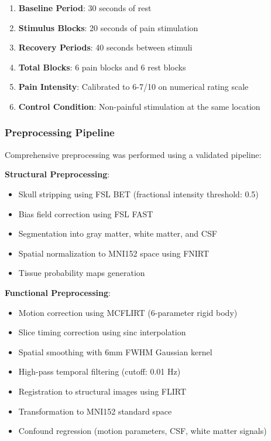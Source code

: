 \documentclass[10pt,journal,compsoc]{IEEEtran}
\begin{document}
\begin{enumerate}
\item \textbf{Baseline Period}: 30 seconds of rest
\item \textbf{Stimulus Blocks}: 20 seconds of pain stimulation
\item \textbf{Recovery Periods}: 40 seconds between stimuli
\item \textbf{Total Blocks}: 6 pain blocks and 6 rest blocks
\item \textbf{Pain Intensity}: Calibrated to 6-7/10 on numerical rating scale
\item \textbf{Control Condition}: Non-painful stimulation at the same location
\end{enumerate}

\subsubsection{Preprocessing Pipeline}

Comprehensive preprocessing was performed using a validated pipeline:

\textbf{Structural Preprocessing}:
\begin{itemize}
\item Skull stripping using FSL BET (fractional intensity threshold: 0.5)
\item Bias field correction using FSL FAST
\item Segmentation into gray matter, white matter, and CSF
\item Spatial normalization to MNI152 space using FNIRT
\item Tissue probability maps generation
\end{itemize}

\textbf{Functional Preprocessing}:
\begin{itemize}
\item Motion correction using MCFLIRT (6-parameter rigid body)
\item Slice timing correction using sinc interpolation
\item Spatial smoothing with 6mm FWHM Gaussian kernel
\item High-pass temporal filtering (cutoff: 0.01 Hz)
\item Registration to structural images using FLIRT
\item Transformation to MNI152 standard space
\item Confound regression (motion parameters, CSF, white matter signals)
\end{itemize}
\end{document}
